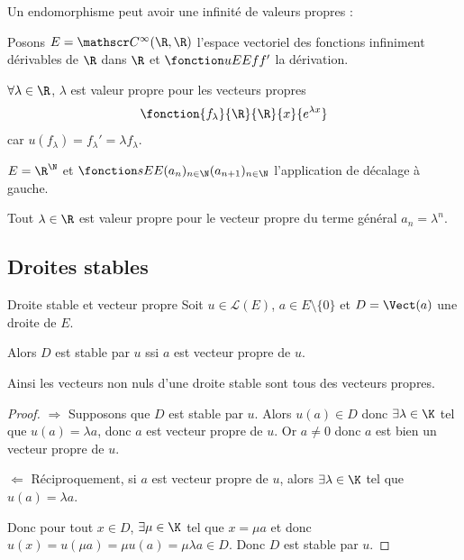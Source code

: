 Un endomorphisme peut avoir une infinité de valeurs propres :


\begin{exemple}
    Posons $E = \mathscr C^\infty(\R, \R)$ l'espace vectoriel des fonctions 
    infiniment dérivables de $\R$ dans $\R$ et $\fonction u E E f {f'}$ la dérivation. 

    $\forall \lambda \in \R$, $\lambda$ est valeur propre pour les vecteurs propres 
    $$\fonction{f_\lambda}{\R}{\R}{x}{e^{\lambda x}}$$ car
    $u(f_\lambda) = f_\lambda' = \lambda f_\lambda$.
\end{exemple}

\begin{exemple}
    $E = \R^{\N}$ et $\fonction s E E {(a_n)_{n \in \N}}{(a_{n + 1})_{n \in \N}}$ l'application de décalage à gauche.

    Tout $\lambda \in \R$ est valeur propre pour le vecteur propre du terme général $a_n = \lambda^n$.
\end{exemple}

\subsection{Droites stables }

\begin{proposition}{Droite stable et vecteur propre}{}
    Soit $u \in \mathscr L(E)$, $a \in E \setminus \{0\}$ et $D = \Vect(a)$ une droite de $E$. 

    Alors $D$ est stable par $u$ ssi $a$ est vecteur propre de $u$.

    Ainsi les vecteurs non nuls d'une droite stable sont tous des vecteurs propres. 
\end{proposition}

\begin{proof}
    $\Rightarrow$ Supposons que $D$ est stable par $u$. Alors $u(a) \in D$ donc 
    $\exists \lambda \in \K$ tel que $u(a) = \lambda a$, donc $a$ est vecteur propre de $u$.
    Or $a \neq 0$ donc $a$ est bien un vecteur propre de $u$.

    \lvspace $\Leftarrow$ Réciproquement, si $a$ est vecteur propre de $u$, alors 
    $\exists \lambda \in \K$ tel que $u(a) = \lambda a$. 

    Donc pour tout $x \in D$, $\exists \mu \in \K$ tel que $x = \mu a$ et donc 
    $u(x) = u(\mu a) = \mu u(a) = \mu \lambda a \in D$. Donc $D$ est stable par $u$.
\end{proof}

